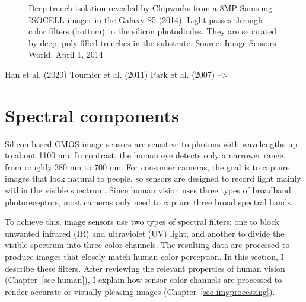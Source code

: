 \documentclass[
  letterpaper,
]{book}
\begin{document}
\begin{figure}


\caption{\label{fig-sensor-deeptrench}Deep trench isolation revealed by
Chipworks from a 8MP Samsung ISOCELL imager in the Galaxy S5 (2014).
Light passes through color filters (bottom) to the silicon photodiodes.
They are separated by deep, poly-filled trenches in the substrate.
Source: Image Sensors World, April 1, 2014}

\end{figure}%

Han et al. (2020) Tournier et al. (2011) Park et al. (2007)
--\textgreater{}

\section{Spectral components}\label{sec-sensor-wavelength}

Silicon-based CMOS image sensors are sensitive to photons with
wavelengths up to about 1100 nm. In contrast, the human eye detects only
a narrower range, from roughly 380 nm to 700 nm. For consumer cameras,
the goal is to capture images that look natural to people, so sensors
are designed to record light mainly within the visible spectrum. Since
human vision uses three types of broadband photoreceptors, most cameras
only need to capture three broad spectral bands.

To achieve this, image sensors use two types of spectral filters: one to
block unwanted infrared (IR) and ultraviolet (UV) light, and another to
divide the visible spectrum into three color channels. The resulting
data are processed to produce images that closely match human color
perception. In this section, I describe these filters. After reviewing
the relevant properties of human vision (Chapter~\ref{sec-human}), I
explain how sensor color channels are processed to render accurate or
visually pleasing images (Chapter~\ref{sec-imgprocessing}).
\end{document}

